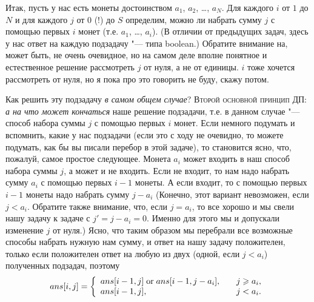 Итак, пусть у нас есть монеты достоинством $a_1$, $a_2$, \dots, $a_N$. Для каждого $i$ от $1$ до 
$N$ и для каждого $j$ от $0$ (!) до $S$ определим, можно ли набрать сумму $j$ с помощью первых $i$ монет 
(т.е. $a_1$, \dots, $a_i$). (В отличии от предыдущих задач, здесь у нас ответ на каждую подзадачу 
"--- типа boolean.) Обратите внимание на, может быть, не очень очевидное, но на самом деле  
вполне понятное и естественное решение рассмотреть $j$ от нуля, а не от единицы. $i$ тоже хочется 
рассмотреть от нуля, но я пока про это говорить не буду, скажу потом.

Как решить эту подзадачу \textit{в самом общем случае}? \textsc{Второй основной принцип ДП:} \textit{а на что может кончаться} 
наше решение подзадачи, т.е. в данном случае "--- способ набора суммы $j$ с помощью первых $i$ 
монет. Если немного подумать и вспомнить, какие у нас подзадачи (если это с ходу не очевидно, то 
можете подумать, как бы вы писали перебор в этой задаче), то становится ясно, что, пожалуй, самое 
простое следующее. Монета $a_i$ может входить в наш способ набора суммы $j$, а может и не входить. 
Если не входит, то нам надо набрать сумму $a_i$ с помощью первых $i-1$ монеты. А если входит, то с 
помощью первых $i-1$ монеты надо набрать сумму $j-a_i$ (Конечно, этот вариант невозможен, если 
$j<a_i$. Обратите также внимание, что, если $j=a_i$, то все хорошо и мы свели нашу задачу к задаче 
с $j'=j-a_i=0$. Именно для этого мы и допускали изменение $j$ от нуля.) Ясно, что таким образом мы 
перебрали все возможные способы набрать нужную нам сумму, и ответ на нашу задачу положителен, 
только если положителен ответ на любую из двух (одной, если $j<a_i$) полученных подзадач, поэтому 
$$
ans[i,j]=\left\{
\begin{array}{ll}
ans[i-1,j] \mathrel{\mathrm{or}} ans[i-1,j-a_i],&\quad j\geqslant a_i,\\
ans[i-1,j],&\quad j<a_i.
\end{array}\right.
$$

